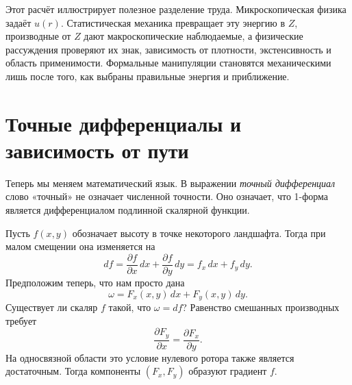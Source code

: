 \begin{classroomqa}
\end{classroomqa}

Этот расчёт иллюстрирует полезное разделение труда. Микроскопическая физика задаёт \(u(r)\). Статистическая механика превращает эту энергию в \(Z\), производные от \(Z\) дают макроскопические наблюдаемые, а физические рассуждения проверяют их знак, зависимость от плотности, экстенсивность и область применимости. Формальные манипуляции становятся механическими лишь после того, как выбраны правильные энергия и приближение.

\section{Точные дифференциалы и зависимость от пути}

Теперь мы меняем математический язык. В выражении \emph{точный дифференциал} слово «точный» не означает численной точности. Оно означает, что 1-форма является дифференциалом подлинной скалярной функции.

Пусть \(f(x,y)\) обозначает высоту в точке некоторого ландшафта. Тогда при малом смещении она изменяется на
\begin{equation}
 df=
 \frac{\partial f}{\partial x}\,dx+
 \frac{\partial f}{\partial y}\,dy
 =f_x\,dx+f_y\,dy.
 \label{eq:sm6-total-differential}
\end{equation}
Предположим теперь, что нам просто дана
\begin{equation}
 \omega=F_x(x,y)\,dx+F_y(x,y)\,dy.
 \label{eq:sm6-one-form}
\end{equation}
Существует ли скаляр \(f\) такой, что \(\omega=df\)? Равенство смешанных производных требует
\begin{equation}
 \frac{\partial F_y}{\partial x}
 =
 \frac{\partial F_x}{\partial y}.
 \label{eq:sm6-exactness-condition}
\end{equation}
На односвязной области это условие нулевого ротора также является достаточным. Тогда компоненты \((F_x,F_y)\) образуют градиент \(f\).

